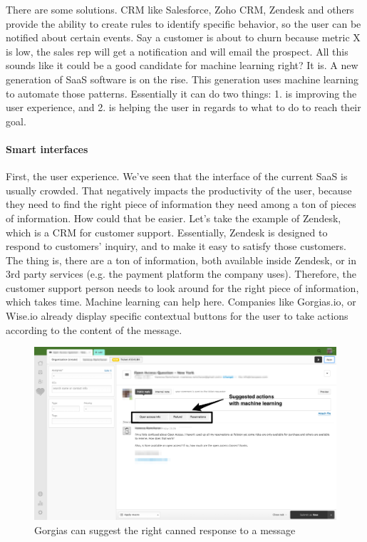 \documentclass[12pt]{article}
\begin{document}
There are some solutions. CRM like Salesforce, Zoho CRM, Zendesk and others
provide the ability to create rules to identify specific behavior, so the user
can be notified about certain events. Say a customer is about to churn because
metric X is low, the sales rep will get a notification and will email the
prospect. All this sounds like it could be a good candidate for machine learning
right? It is. A new generation of SaaS software is on the rise. This generation
uses machine learning to automate those patterns. Essentially it can do two
things: 1. is improving the user experience, and 2. is helping the user in
regards to what to do to reach their goal.

\paragraph{Smart interfaces}

First, the user experience. We've seen that the interface of the current SaaS is
usually crowded. That negatively impacts the productivity of the user, because
they need to find the right piece of information they need among a ton of pieces
of information. How could that be easier. Let's take the example of Zendesk,
which is a CRM for customer support. Essentially, Zendesk is designed to respond
to customers' inquiry, and to make it easy to satisfy those customers. The thing
is, there are a ton of information, both available inside Zendesk, or in 3rd
party services (e.g. the payment platform the company uses). Therefore, the
customer support person needs to look around for the right piece of information,
which takes time. Machine learning can help here. Companies like Gorgias.io, or
Wise.io already display specific contextual buttons for the user to take actions
according to the content of the message.

\smallskip

\begin{figure}[ht]
    \centering
    \includegraphics[width=\textwidth]{zendesk}
    \caption{Gorgias can suggest the right canned response to a message}
    \label{fig:gorgias}
\end{figure}
\end{document}
